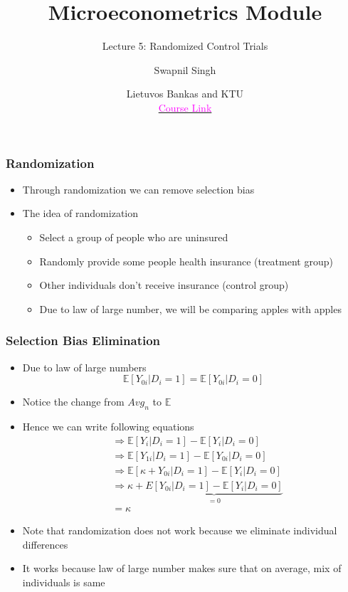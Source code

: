 \documentclass{beamer}
\title{Microeconometrics Module}
\subtitle{Lecture 5: Randomized Control Trials}
\author{Swapnil Singh}
\date{Lietuvos Bankas and KTU \\ \href{https://github.com/swapnil1987/econometrics-2024}{\textcolor{magenta}{Course Link}}}
\begin{document}
	
	\maketitle
	
	\begin{frame}
		\frametitle{Randomization}
		\begin{itemize}
			\item Through randomization we can remove selection bias
			\item The idea of randomization
			\begin{itemize}
				\item Select a group of people who are uninsured
				\item Randomly provide some people health insurance (treatment group)
				\item Other individuals don't receive insurance (control group)
				\item Due to law of large number, we will be comparing apples with apples
			\end{itemize}
		\end{itemize}
	\end{frame}
	
	\begin{frame}
		\frametitle{Selection Bias Elimination}
		\begin{itemize}
			\item Due to law of large numbers
			$$ \mathbb E[Y_{0i} | D_i = 1] = \mathbb E[Y_{0i} | D_i = 0] $$
			\item Notice the change from $Avg_n$ to $\mathbb E$
			\item Hence we can write following equations
			\begin{align*}
				&\Rightarrow \mathbb E[Y_i | D_i = 1] - \mathbb E[Y_i | D_i = 0]\\
				&\Rightarrow \mathbb E[Y_{1i} | D_i = 1] - \mathbb E[Y_{0i} | D_i = 0]\\
				&\Rightarrow \mathbb E[\kappa + Y_{0i} | D_i = 1] - \mathbb E[Y_i | D_i = 0]\\
				&\Rightarrow \kappa + \underbrace{E[Y_{0i} | D_i = 1] - \mathbb E[Y_i | D_i = 0]}_{= 0}\\
				&= \kappa
			\end{align*}
			\item Note that randomization does not work because we eliminate individual differences
			\item It works because law of large number makes sure that on average, mix of individuals is same
		\end{itemize}
	\end{frame}
	
\end{document}
